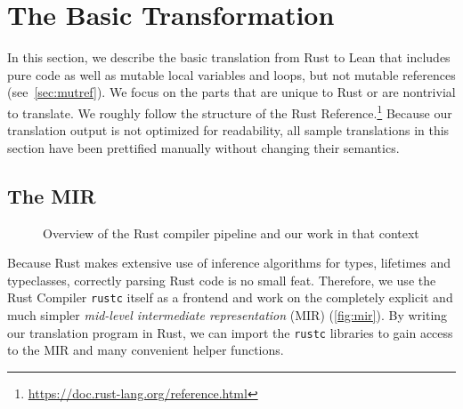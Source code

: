 \section{The Basic Transformation}
\label{sec:trans}

In this section, we describe the basic translation from Rust to Lean that
includes pure code as well as mutable local variables and loops, but not mutable
references (see~\autoref{sec:mutref}). We focus on the parts that are unique to
Rust or are nontrivial to translate. We roughly follow the structure of the
Rust Reference.\footnote{\url{https://doc.rust-lang.org/reference.html}} Because
our translation output is not optimized for readability, all sample translations
in this section have been prettified manually without changing their semantics.

\subsection{The MIR}
\label{sec:mir}

\begin{figure}[!bp]
  \centering
  \caption{Overview of the Rust compiler pipeline and our work in that context}
  \label{fig:mir}
\end{figure}

Because Rust makes extensive use of inference algorithms for types, lifetimes and typeclasses,
correctly parsing Rust code is no small feat. Therefore, we use the Rust
Compiler \texttt{rustc} itself as a frontend and work on the completely explicit and
much simpler \emph{mid-level intermediate representation} (MIR)
(\autoref{fig:mir}). By writing our translation program in Rust, we can import
the \texttt{rustc} libraries to gain access to the MIR and many convenient
helper functions.

